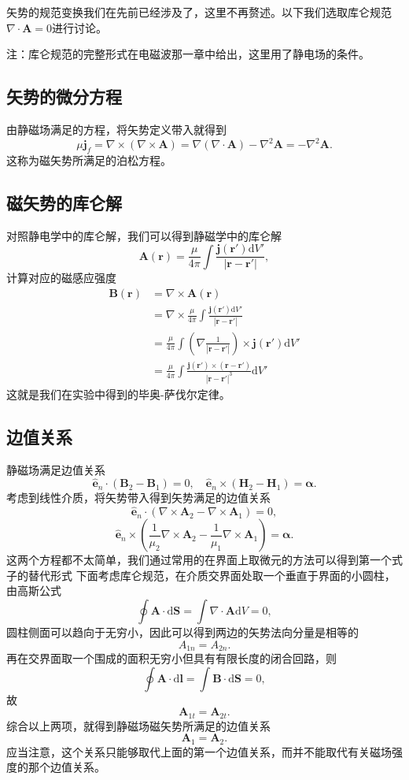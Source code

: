 \documentclass[UTF8]{ctexbook}
\renewcommand{\d}{\mathrm{d}}
\renewcommand{\b}{\boldsymbol}
\numberwithin{equation}{chapter}
\begin{document}
	矢势的规范变换我们在先前已经涉及了，这里不再赘述。以下我们选取库仑规范$\nabla\cdot\b{A}=0$进行讨论。
	
	注：库仑规范的完整形式在电磁波那一章中给出，这里用了静电场的条件。
	
	\subsection{矢势的微分方程}
	由静磁场满足的方程，将矢势定义带入就得到
	\[\mu\b{j}_f=\nabla\times(\nabla\times\b{A})=\nabla(\nabla\cdot\b{A})-\nabla^2\b{A}=-\nabla^2\b{A}.\]
	这称为磁矢势所满足的泊松方程。
	
	\subsection{磁矢势的库仑解}
	对照静电学中的库仑解，我们可以得到静磁学中的库仑解
	\[\b{A}(\b{r})=\frac{\mu}{4\pi}\int \frac{\b{j}(\b{r}')\d V'}{|\b{r}-\b{r}'|},\]
	计算对应的磁感应强度
	\begin{align*}
		\b{B}(\b{r})&=\nabla\times\b{A}(\b{r})\\
		&=\nabla\times\frac{\mu}{4\pi}\int \frac{\b{j}(\b{r}')\d V'}{|\b{r}-\b{r}'|} \\
		&=\frac{\mu}{4\pi}\int\left(\nabla\frac{1}{|\b{r}-\b{r}'|}\right)\times\b{j}(\b{r}')\d V' \\
		&=\frac{\mu}{4\pi}\int \frac{\b{j}(\b{r}')\times(\b{r}-\b{r}')}{|\b{r}-\b{r}'|^3}\d V'
	\end{align*}
	这就是我们在实验中得到的毕奥-萨伐尔定律。
	
	\subsection{边值关系}
	静磁场满足边值关系
	\[\hat{\b{e}}_n\cdot(\b{B}_2-\b{B}_1)=0,\quad \hat{\b{e}}_n\times(\b{H}_2-\b{H}_1)=\b{\alpha}.\]
	考虑到线性介质，将矢势带入得到矢势满足的边值关系
	\[\hat{\b{e}}_n\cdot(\nabla\times\b{A}_2-\nabla\times\b{A}_1)=0,\]
	\[\hat{\b{e}}_n\times\left(\frac{1}{\mu_2}\nabla\times\b{A}_2-\frac{1}{\mu_1}\nabla\times\b{A}_1\right)=\b{\alpha}.\]
	这两个方程都不太简单，我们通过常用的在界面上取微元的方法可以得到第一个式子的替代形式
	下面考虑库仑规范，在介质交界面处取一个垂直于界面的小圆柱，由高斯公式
	\[\oint \b{A}\cdot\d \b{S}=\int \nabla\cdot\b{A} \d V=0,\]
	圆柱侧面可以趋向于无穷小，因此可以得到两边的矢势法向分量是相等的
	\[A_{1n}=A_{2n}.\]
	再在交界面取一个围成的面积无穷小但具有有限长度的闭合回路，则
	\[\oint \b{A}\cdot\d\b{l}=\int \b{B}\cdot\d\b{S}=0,\]
	故
	\[\b{A}_{1t}=\b{A}_{2t}.\]
	综合以上两项，就得到静磁场磁矢势所满足的边值关系
	\[\b{A}_1=\b{A}_2.\]
	应当注意，这个关系只能够取代上面的第一个边值关系，而并不能取代有关磁场强度的那个边值关系。
	
\end{document}
